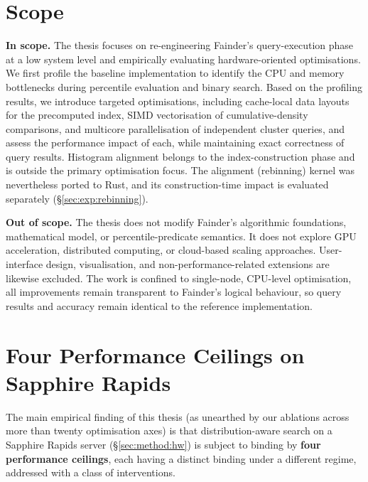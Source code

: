 \section{Scope}
\textbf{In scope.} The thesis focuses on re-engineering Fainder's query-execution phase at a low system level and empirically evaluating hardware-oriented optimisations. We first profile the baseline implementation to identify the CPU and memory bottlenecks during percentile evaluation and binary search. Based on the profiling results, we introduce targeted optimisations, including cache-local data layouts for the precomputed index, SIMD vectorisation of cumulative-density comparisons, and multicore parallelisation of independent cluster queries, and assess the performance impact of each, while maintaining exact correctness of query results. Histogram alignment belongs to the index-construction phase and is outside the primary optimisation focus. The alignment (rebinning) kernel was nevertheless ported to Rust, and its construction-time impact is evaluated separately (§\ref{sec:exp:rebinning}).

\textbf{Out of scope.} The thesis does not modify Fainder's algorithmic foundations, mathematical model, or percentile-predicate semantics. It does not explore GPU acceleration, distributed computing, or cloud-based scaling approaches. User-interface design, visualisation, and non-performance-related extensions are likewise excluded. The work is confined to single-node, CPU-level optimisation, all improvements remain transparent to Fainder's logical behaviour, so query results and accuracy remain identical to the reference implementation.

\section{Four Performance Ceilings on Sapphire Rapids\label{sec:ceilings}}

The main empirical finding of this thesis (as unearthed by our ablations across more than twenty optimisation axes) is that distribution-aware search on a Sapphire Rapids server (§\ref{sec:method:hw}) is subject to binding by \textbf{four performance ceilings}, each having a distinct binding under a different regime, addressed with a class of interventions.

